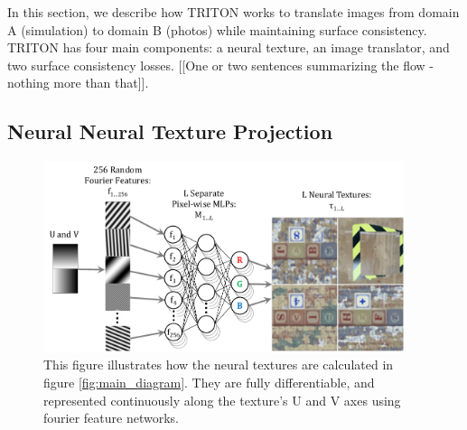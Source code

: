 \documentclass{article}
\begin{document}
	In this section, we describe how TRITON works to translate images from domain A (simulation) to domain B (photos) while maintaining surface consistency. 
	TRITON has four main components: a neural texture, an image translator, and two surface consistency losses. [[One or two sentences summarizing the flow - nothing more than that]].
	

\subsection{Neural Neural Texture Projection}

	\begin{figure}[H]
		\begin{center}
			\includegraphics[width=300pt]{../images/learnable_textures.pdf}
		\end{center}
		\caption{
			This figure illustrates how the neural textures are calculated in figure \ref{fig:main_diagram}. They are fully differentiable, and represented continuously along the texture's U and V axes using fourier feature networks.
		}
		\label{fig:learnable_textures}
	\end{figure}

\end{document}
